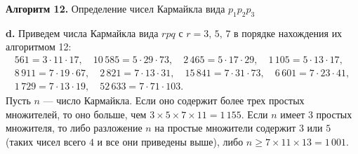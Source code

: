 \documentclass{mai_book}
\begin{document}
\begin{center}
\end{center}
\begin{center}
	\textbf{Алгоритм 12. } Определение чисел Кармайкла вида $p_1 p_2 p_3$ 
\end{center}
\textbf{d. } Приведем числа Кармайкла вида $rpq$ с $r = 3,\,5,\,7$ в порядке нахождения их алгоритмом 12:
\begin{gather*}
	561 = 3 \cdot 11 \cdot 17, \quad 10\,585 = 5 \cdot 29 \cdot 73, \quad 2\,465 = 5 \cdot 17 \cdot 29, \quad 1\,105 = 5 \cdot 13 \cdot 17, \\
	8\,911 = 7 \cdot 19 \cdot 67, \quad 2\,821 = 7 \cdot 13 \cdot 31, \quad 15\,841 = 7 \cdot 31 \cdot 73, \quad 6\,601 = 7 \cdot 23 \cdot 41, \\
	1\,729 = 7 \cdot 13 \cdot 19, \quad 52\,633 = 7 \cdot 71 \cdot 103.
\end{gather*}
Пусть $n$ --- число Кармайкла. Если оно содержит более трех простых множителей, то оно больше, чем $3 \times 5 \times 7 \times 11 = 1\,155$. Если $n$ имеет $3$ простых множителя, то либо разложение $n$ на простые множители содержит $3$ или $5$ (таких чисел всего $4$ и все они приведены выше), либо $n \ge 7 \times 11 \times 13 = 1\,001$. \\

 \\
\end{document}
